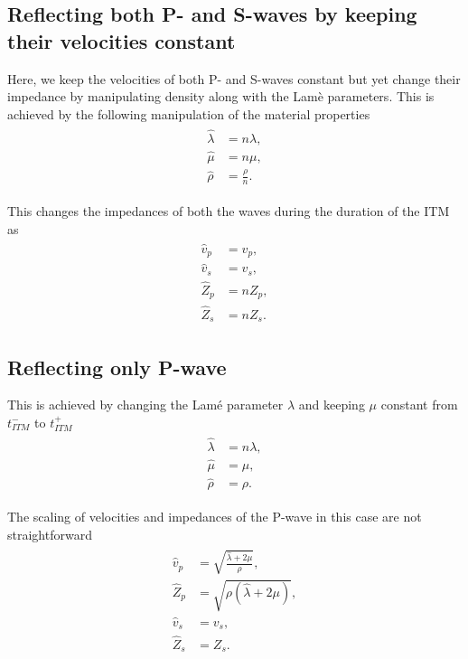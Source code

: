 \subsection{Reflecting both P- and S-waves by keeping their velocities constant}\label{sec:reflecting_both_constant}
Here, we keep the velocities of both P- and S-waves constant but yet change their impedance by manipulating density along with the Lam\`{e} parameters. This is achieved by the following manipulation of the material properties
\begin{align}
    \begin{split}
        \hat{\lambda} &= n \lambda ,\\
        \hat{\mu} &= n \mu ,\\
        \hat{\rho} &= \frac{\rho} {n} .
    \end{split}
\end{align}

This changes the impedances of both the waves during the duration of the \ac{ITM} as
\begin{align}
    \begin{split}
        \hat{v}_p &= v_p ,\\
        \hat{v}_s &= v_s ,\\
        \hat{Z}_p &= n Z_p ,\\
        \hat{Z}_s &= n Z_s .
    \end{split}
\end{align}

\subsection{Reflecting only P-wave}\label{sec:reflecting_p}
This is achieved by changing the Lam\'{e} parameter $\lambda$ and keeping $\mu$ constant from $t_{ITM}^-$ to $t_{ITM}^+$
\begin{align}
    \begin{split}
        \hat{\lambda} &= n \lambda ,\\
        \hat{\mu} &= \mu ,\\
        \hat{\rho} &= \rho .
    \end{split}
\end{align}

The scaling of velocities and impedances of the P-wave in this case are not straightforward 
\begin{align}
    \begin{split}
        \hat{v}_p &= \sqrt{\frac{\hat{\lambda} + 2 \mu}{\rho}} ,\\
        \hat{Z}_p &= \sqrt{\rho\left(\hat{\lambda} + 2 \mu \right)} ,\\
        \hat{v}_s &= v_s ,\\
        \hat{Z}_s &= Z_s . 
    \end{split}
\end{align}

